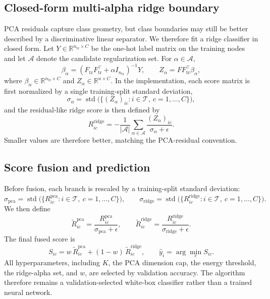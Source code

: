 \documentclass{article}
\newcommand{\Fsel}{F}
\newcommand{\Ftr}{F_{\mathrm{tr}}}
\newcommand{\Ytr}{Y}
\newcommand{\Train}{\mathcal{T}}
\newcommand{\Alphas}{\mathcal{A}}
\begin{document}
\subsection{Closed-form multi-alpha ridge boundary}
PCA residuals capture class geometry, but class boundaries may still be better
described by a discriminative linear separator. We therefore fit a ridge
classifier in closed form. Let
$\Ytr\in\mathbb{R}^{n_{\mathrm{tr}}\times C}$ be the one-hot label matrix on
the training nodes and let $\Alphas$ denote the candidate regularization set.
For $\alpha\in\Alphas$,
\begin{equation}
\beta_\alpha
=
(\Ftr\Ftr^\top+\alpha I_{n_{\mathrm{tr}}})^{-1}\Ytr,
\qquad
Z_\alpha
=
\Fsel\Ftr^\top\beta_\alpha,
\label{eq:ridge}
\end{equation}
where $\beta_\alpha\in\mathbb{R}^{n_{\mathrm{tr}}\times C}$ and
$Z_\alpha\in\mathbb{R}^{n\times C}$. In the implementation, each score matrix
is first normalized by a single training-split standard deviation,
\begin{equation}
\sigma_\alpha
=
\operatorname{std}\bigl(\{(Z_\alpha)_{ic}: i\in\Train,\ c=1,\ldots,C\}\bigr),
\label{eq:ridge-std-alpha}
\end{equation}
and the residual-like ridge score is then defined by
\begin{equation}
R^{\mathrm{ridge}}_{ic}
=
-\frac{1}{|\Alphas|}
\sum_{\alpha\in\Alphas}
\frac{(Z_\alpha)_{ic}}{\sigma_\alpha+\epsilon}.
\label{eq:ridge-score}
\end{equation}
Smaller values are therefore better, matching the PCA-residual convention.



\subsection{Score fusion and prediction}
Before fusion, each branch is rescaled by a training-split standard deviation:
\begin{equation}
\sigma_{\mathrm{pca}}
=
\operatorname{std}\bigl(\{R^{\mathrm{pca}}_{ic}: i\in\Train,\ c=1,\ldots,C\}\bigr),
\qquad
\sigma_{\mathrm{ridge}}
=
\operatorname{std}\bigl(\{R^{\mathrm{ridge}}_{ic}: i\in\Train,\ c=1,\ldots,C\}\bigr).
\label{eq:branch-std}
\end{equation}
We then define
\begin{equation}
\widetilde R^{\mathrm{pca}}_{ic}
=
\frac{R^{\mathrm{pca}}_{ic}}{\sigma_{\mathrm{pca}}+\epsilon},
\qquad
\widetilde R^{\mathrm{ridge}}_{ic}
=
\frac{R^{\mathrm{ridge}}_{ic}}{\sigma_{\mathrm{ridge}}+\epsilon}.
\label{eq:branch-normalization}
\end{equation}
The final fused score is
\begin{equation}
S_{ic}
=
w\,\widetilde R^{\mathrm{pca}}_{ic}
+
(1-w)\,\widetilde R^{\mathrm{ridge}}_{ic},
\qquad
\hat y_i=\arg\min_c S_{ic}.
\label{eq:fusion}
\end{equation}
All hyperparameters, including $K$, the PCA dimension cap, the energy
threshold, the ridge-alpha set, and $w$, are selected by validation accuracy.
The algorithm therefore remains a validation-selected white-box classifier
rather than a trained neural network.
\end{document}
